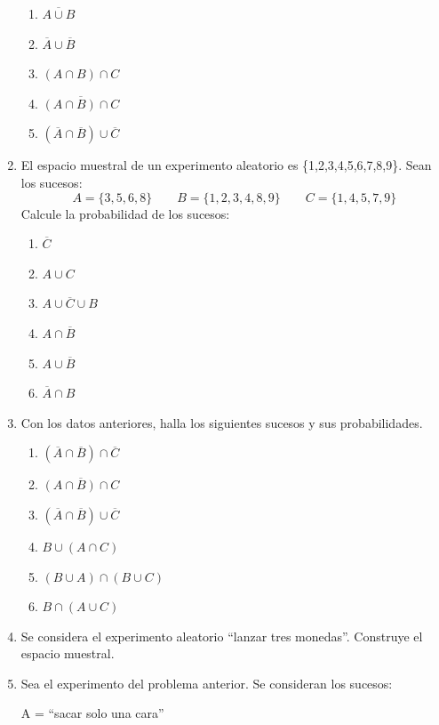 \documentclass[twoside]{article}
\begin{document}
\begin{enumerate}
\begin{multicols}{3}
\begin{enumerate}
    \item $ \overline{A\cup B} $
    \item $ \overline{A}\cup \overline{B} $
    \item $ (A\cap B)\cap C $
    \item $ \overline{(A\cap B)\cap C} $
    \item $ (\overline{A}\cap\overline{B})\cup\overline{C} $
  \end{enumerate}
\end{multicols}
\item El espacio muestral de un experimento aleatorio es  \{1,2,3,4,5,6,7,8,9\}. Sean los sucesos:
\[ A=\{3,5,6,8\}\qquad B=\{1,2,3,4,8,9\}\qquad C=\{1,4,5,7,9\} \]
Calcule la probabilidad de los sucesos:
\begin{multicols}{3}
  \begin{enumerate}
    \item $ \overline{C} $
    \item $ A\cup C $
    \item $ A\cup\overline{C}\cup B $
    \item $ A\cap\overline{B} $
    \item $ A\cup\overline{B} $
    \item $ \overline{A}\cap B $
  \end{enumerate}
\end{multicols}
\item Con los datos anteriores, halla los siguientes sucesos y sus probabilidades.
\begin{multicols}{2}
  \begin{enumerate}
    \item $ (\overline{A}\cap\overline{B})\cap\overline{C} $
    \item $ \overline{(A\cap B)\cap C} $
    \item $ (\overline{A}\cap\overline{B})\cup\overline{C} $
    \item $ B\cup(A\cap C) $
    \item $ (B\cup A)\cap(B\cup C) $
    \item $ B\cap (A\cup C) $
  \end{enumerate}
\end{multicols}
\item Se considera el experimento aleatorio “lanzar tres monedas”. Construye el espacio muestral.
\item Sea el experimento del problema anterior. Se  consideran los sucesos:
\begin{multicols}{2}
  A = “sacar solo una cara”\\

\end{multicols}
\end{enumerate}
\end{document}

